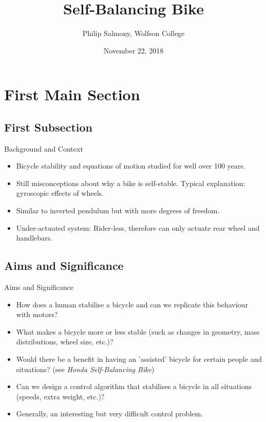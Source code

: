 \documentclass{beamer}
\title{Self-Balancing Bike}
\author{Philip Salmony, Wolfson College}
\date{November 22, 2018}
\begin{document}
\begin{frame}
  \titlepage
\end{frame}


\section{First Main Section}

\subsection{First Subsection}

\begin{frame}{Background and Context}

  \begin{itemize}
  \setlength\itemsep{0.5em}
  \item {Bicycle stability and equations of motion studied for well over 100 years.}
  \item {Still misconceptions about why a bike is self-stable. Typical explanation: gyroscopic effects of wheels.}
  \item {Similar to inverted pendulum but with more degrees of freedom.}
  \item {Under-actuated system: Rider-less, therefore can only actuate rear wheel and handlebars.}
  \end{itemize}
    
\end{frame}

\subsection{Aims and Significance}

\begin{frame}{Aims and Significance}

	\begin{itemize}
	\setlength\itemsep{0.75em}
		\item {How does a human stabilise a bicycle and can we replicate this behaviour with motors?}
		\item {What makes a bicycle more or less stable (such as changes in geometry, mass distributions, wheel size,
etc.)}?
		\item {Would there be a benefit in having an 'assisted' bicycle for certain people and situations? (see \textit{Honda Self-Balancing Bike})}
		\item {Can we design a control algorithm that stabilises a bicycle in all situations (speeds, extra weight, etc.)?}
		\item {Generally, an interesting but very difficult control problem.}
  		\end{itemize}
  
\end{frame}
\end{document}
